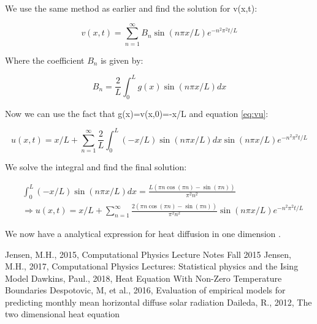 \documentclass{article}
\begin{document}
 We use the same method as earlier and find the solution for v(x,t):
 
 \begin{equation}
v(x,t) = \sum_{n=1}^{\infty}B_n\sin{(n\pi x/L)}e^{-n^2\pi^2t/L}
\end{equation}
 
Where the coefficient $B_n$ is given by:

\begin{equation}
B_n=\frac{2}{L}\int_0^Lg(x)\sin{(n\pi x/L)} dx
\end{equation}

Now we can use the fact that g(x)=v(x,0)=-x/L and equation \ref{eq:vu}:

\begin{equation}
u(x,t)=x/L+\sum_{n=1}^{\infty}\frac{2}{L}\int_0^L(-x/L)\sin{(n\pi x/L)} dx\sin{(n\pi x/L)}e^{-n^2\pi^2t/L}
\end{equation}

We solve the integral and find the final solution:

\begin{equation*}
\begin{split}
&\int_0^L(-x/L)\sin{(n\pi x/L)} dx=\frac{L(\pi n \cos{(\pi n)}-\sin{(\pi n)})}{\pi^2n^2}\\
&\Rightarrow u(x,t)=x/L+\sum_{n=1}^{\infty}\frac{2(\pi n \cos{(\pi n)}-\sin{(\pi n)})}{\pi^2n^2}\sin{(n\pi x/L)}e^{-n^2\pi^2t/L}
\end{split}
\end{equation*}

We now have a analytical expression for heat diffusion in one dimension \cite{94}\cite{96}. 

\clearpage

\begin{thebibliography}{9}
	Jensen, M.H., 2015, Computational Physics Lecture Notes Fall 2015
	Jensen, M.H., 2017, Computational Physics Lectures: Statistical physics and the Ising Model
	Dawkins, Paul., 2018, Heat Equation With Non-Zero Temperature Boundaries
	Despotovic, M, et al., 2016, Evaluation of empirical models for predicting monthly mean horizontal diffuse solar radiation
	Daileda, R.,  2012, The two dimensional heat equation
	
\end{thebibliography}
\end{document}
